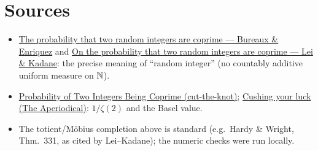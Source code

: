 \documentclass[11pt]{article}
\begin{document}
\section*{Sources}
\begin{itemize}[nosep]
  \item \href{https://arxiv.org/pdf/1612.03700}{The probability that two random integers are coprime --- Bureaux \& Enriquez} and \href{https://arxiv.org/pdf/1806.00053}{On the probability that two random integers are coprime --- Lei \& Kadane}: the precise meaning of ``random integer'' (no countably additive uniform measure on $\mathbb{N}$).
  \item \href{https://www.cut-the-knot.org/m/Probability/TwoCoprime.shtml}{Probability of Two Integers Being Coprime (cut-the-knot)}; \href{https://aperiodical.com/2013/06/cushing-your-luck-properties-of-randomly-chosen-numbers/}{Cushing your luck (The Aperiodical)}: $1/\zeta(2)$ and the Basel value.
  \item The totient/M\"obius completion above is standard (e.g.\ Hardy \& Wright, Thm.\ 331, as cited by Lei--Kadane); the numeric checks were run locally.
\end{itemize}
\end{document}

